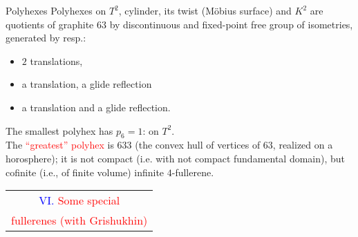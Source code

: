 \documentclass[%
pdf,
colorBG,
slideColor,
]{prosper}
\begin{document}
\begin{slide}{Polyhexes}
Polyhexes on $T^2$, cylinder, its twist (M\"obius surface) and $K^2$
are quotients of graphite $63$ by discontinuous and fixed-point free
group of isometries, generated by resp.: 
\begin{itemize}
\item $2$ translations,
\item a translation, a glide reflection
\item a translation and a glide reflection.
\end{itemize}

The smallest polyhex has $p_6=1$:  on $T^2$.\\
The \textcolor{red}{``greatest'' polyhex} is $633$ (the convex hull of vertices
of $63$, realized on a horosphere); it is not compact (i.e.
with not compact fundamental domain), but cofinite (i.e., of
finite volume) infinite $4$-fullerene.




\end{slide}





\begin{slide}{}
\begin{center}
{\Huge 
\begin{tabular*}{11cm}{c}
\\[-0.4cm]
\textcolor{blue}{VI. }\textcolor{red}{Some special}\\
\textcolor{red}{fullerenes (with Grishukhin)}
\end{tabular*}
}
\end{center}
\end{slide}
\end{document}
